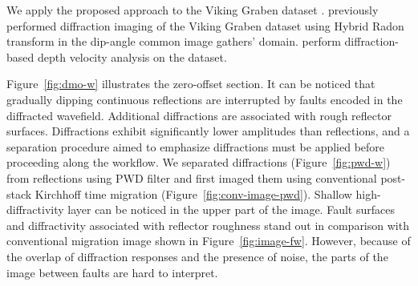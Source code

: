 We apply the proposed approach to the Viking Graben dataset \cite[]{keys1998comparison}.
\cite{klokov2012diffraction} previously performed diffraction imaging of the Viking Graben dataset using Hybrid Radon transform
in the dip-angle common image gathers' domain. \cite{gonzalez2016migration} perform diffraction-based depth velocity analysis on the dataset.

Figure~\ref{fig:dmo-w} illustrates the zero-offset section.
It can be noticed that gradually dipping continuous
reflections are interrupted by faults encoded
in the diffracted wavefield. Additional diffractions are associated with rough reflector surfaces. 
Diffractions exhibit significantly lower
amplitudes than reflections, and a separation procedure aimed to emphasize diffractions must be applied before proceeding along the workflow. 
We separated diffractions (Figure~\ref{fig:pwd-w}) from reflections using PWD filter \cite[]{fomel07} and
first imaged them using conventional post-stack Kirchhoff time migration (Figure~\ref{fig:conv-image-pwd}).
Shallow high-diffractivity layer can be noticed in the upper part of the image. 
Fault surfaces and
diffractivity associated with reflector roughness stand out in comparison with
conventional migration image shown in Figure~\ref{fig:image-fw}. 
However, because of the overlap of diffraction responses 
and the presence of noise, the parts of the image between faults are hard to interpret.



